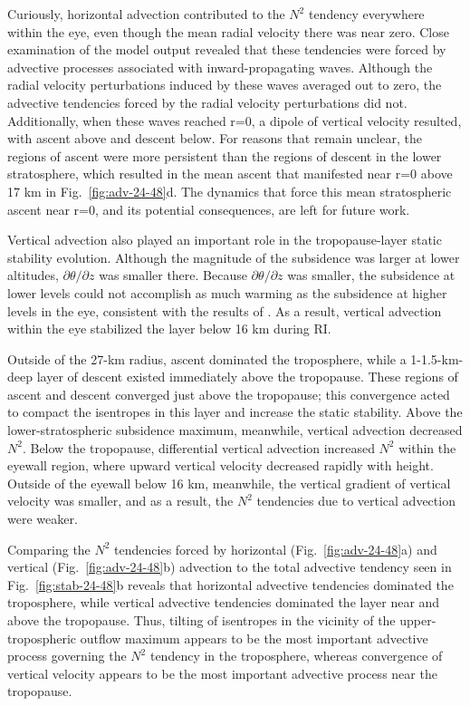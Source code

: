 \documentclass{ametsoc}
\begin{document}
Curiously, horizontal advection contributed to the $N^2$ tendency everywhere within the eye, even though the mean radial velocity there was near zero.
Close examination of the model output revealed that these tendencies were forced by advective processes associated with inward-propagating waves.
Although the radial velocity perturbations induced by these waves averaged out to zero, the advective tendencies forced by the radial velocity perturbations did not.
Additionally, when these waves reached r=0, a dipole of vertical velocity resulted, with ascent above and descent below.
For reasons that remain unclear, the regions of ascent were more persistent than the regions of descent in the lower stratosphere, which resulted in the mean ascent that manifested near r=0 above 17 km in Fig.~\ref{fig:adv-24-48}d.
The dynamics that force this mean stratospheric ascent near r=0, and its potential consequences, are left for future work.

Vertical advection also played an important role in the tropopause-layer static stability evolution.
Although the magnitude of the subsidence was larger at lower altitudes, $\partial \theta/\partial z$ was smaller there.
Because $\partial \theta/\partial z$ was smaller, the subsidence at lower levels could not accomplish as much warming as the subsidence at higher levels in the eye, consistent with the results of \cite{SternZhang2013}.
As a result, vertical advection within the eye stabilized the layer below 16 km during RI.

Outside of the 27-km radius, ascent dominated the troposphere, while a 1-1.5-km-deep layer of descent existed immediately above the tropopause.
These regions of ascent and descent converged just above the tropopause; this convergence acted to compact the isentropes in this layer and increase the static stability.
Above the lower-stratospheric subsidence maximum, meanwhile, vertical advection decreased $N^2$.
Below the tropopause, differential vertical advection increased $N^2$ within the eyewall region, where upward vertical velocity decreased rapidly with height.
Outside of the eyewall below 16 km, meanwhile, the vertical gradient of vertical velocity was smaller, and as a result, the $N^2$ tendencies due to vertical advection were weaker.

Comparing the $N^2$ tendencies forced by horizontal (Fig.~\ref{fig:adv-24-48}a) and vertical (Fig.~\ref{fig:adv-24-48}b) advection to the total advective tendency seen in Fig.~\ref{fig:stab-24-48}b reveals that horizontal advective tendencies dominated the troposphere, while vertical advective tendencies dominated the layer near and above the tropopause.
Thus, tilting of isentropes in the vicinity of the upper-tropospheric outflow maximum appears to be the most important advective process governing the $N^2$ tendency in the troposphere, whereas convergence of vertical velocity appears to be the most important advective process near the tropopause. 
\end{document}
